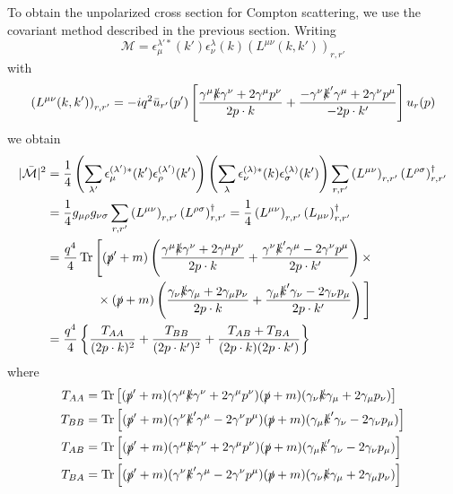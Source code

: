 \documentclass[TheoreticalPhy_ModB.tex]{subfiles}
\begin{document}
To obtain the unpolarized cross section for Compton scattering, we use the covariant method described in the previous section. Writing
\[\mathcal M=\epsilon_\mu^{\lambda'*}(k')\epsilon_\nu^\lambda(k)\left(L^{\mu\nu}(k,k')\right)_{r,r'}\]
with 
\[\left(L^{\mu\nu}(k,k')\right)_{r,r'}=-iq^2\bar u_{r'}(p')\left[\frac{\gamma^\mu\slashed k\gamma^\nu+2\gamma^\mu p^\nu}{2p\cdot k}+\frac{-\gamma^\nu\slashed k'\gamma^\mu+2\gamma^\nu p^\mu}{-2p\cdot k'}\right]u_r(p)\]
we obtain
\begin{align*}
|\bar{\mathcal M}|^2&=\frac14\left(\sum_{\lambda'}\epsilon_\mu^{(\lambda')*}(k')\epsilon_\rho^{(\lambda')}(k')\right)\left(\sum_{\lambda}\epsilon_\nu^{(\lambda)*}(k)\epsilon_\sigma^{(\lambda)}(k')\right)\sum_{r,r'}\left(L^{\mu\nu}\right)_{r,r'}\left(L^{\rho\sigma}\right)^\dagger_{r,r'}\\
&=\frac14g_{\mu\rho}g_{\nu\sigma}\sum_{r,r'}\left(L^{\mu\nu}\right)_{r,r'}\left(L^{\rho\sigma}\right)^\dagger_{r,r'}
=\frac14\left(L^{\mu\nu}\right)_{r,r'}\left(L_{\mu\nu}\right)^\dagger_{r,r'}\\
&=\frac{q^4}4\Tr\Bigg[(\slashed p'+m)\left(\frac{\gamma^\mu\slashed k\gamma^\nu+2\gamma^\mu p^\nu}{2p\cdot k}+\frac{\gamma^\nu\slashed k'\gamma^\mu-2\gamma^\nu p^\mu}{2p\cdot k'}\right)\times\\
&\qquad\qquad\times(\slashed p+m)\left(\frac{\gamma_\nu\slashed k\gamma_\mu+2\gamma_\mu p_\nu}{2p\cdot k}+\frac{\gamma_\mu\slashed k'\gamma_\nu-2\gamma_\nu p_\mu}{2p\cdot k'}\right)\Bigg]\\
&=\frac{q^4}4\left\{\frac{T_{AA}}{(2p\cdot k)^2}+\frac{T_{BB}}{(2p\cdot k')^2}+\frac{T_{AB}+T_{BA}}{(2p\cdot k)(2p\cdot k')}\right\}
\end{align*}
where
\begin{align*}
T_{AA}&=\Tr\left[(\slashed p'+m)(\gamma^\mu\slashed k\gamma^\nu+2\gamma^\mu p^\nu)(\slashed p+m)(\gamma_\nu\slashed k\gamma_\mu+2\gamma_\mu p_\nu)\right]\\
T_{BB}&=\Tr\left[(\slashed p'+m)(\gamma^\nu\slashed k'\gamma^\mu-2\gamma^\nu p^\mu)(\slashed p+m)(\gamma_\mu\slashed k'\gamma_\nu-2\gamma_\nu p_\mu)\right]\\
T_{AB}&=\Tr\left[(\slashed p'+m)(\gamma^\mu\slashed k\gamma^\nu+2\gamma^\mu p^\nu)(\slashed p+m)(\gamma_\mu\slashed k'\gamma_\nu-2\gamma_\nu p_\mu)\right]\\
T_{BA}&=\Tr\left[(\slashed p'+m)(\gamma^\nu\slashed k'\gamma^\mu-2\gamma^\nu p^\mu)(\slashed p+m)(\gamma_\nu\slashed k\gamma_\mu+2\gamma_\mu p_\nu)\right]
\end{align*}
\end{document}
